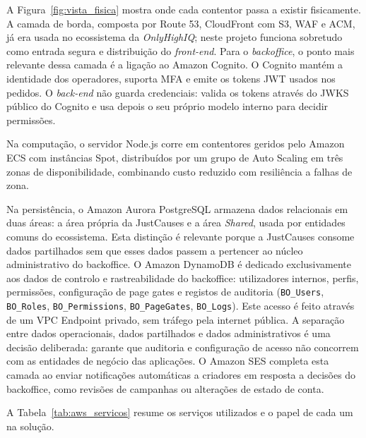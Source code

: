 A Figura~\ref{fig:vista_fisica} mostra onde cada contentor passa a existir fisicamente. A camada de borda, composta por Route 53, CloudFront com S3, \gls{WAF} e ACM, já era usada no ecossistema da \textit{OnlyHighIQ}; neste projeto funciona sobretudo como entrada segura e distribuição do \textit{front-end}. Para o \textit{backoffice}, o ponto mais relevante dessa camada é a ligação ao Amazon Cognito. O Cognito mantém a identidade dos operadores, suporta \gls{MFA} e emite os tokens JWT usados nos pedidos. O \textit{back-end} não guarda credenciais: valida os tokens através do \gls{JWKS} público do Cognito e usa depois o seu próprio modelo interno para decidir permissões.

Na computação, o servidor Node.js corre em contentores geridos pelo Amazon ECS com instâncias Spot, distribuídos por um grupo de Auto Scaling em três zonas de disponibilidade, combinando custo reduzido com resiliência a falhas de zona.

Na persistência, o Amazon Aurora PostgreSQL armazena dados relacionais em duas áreas: a área própria da JustCauses e a área \textit{Shared}, usada por entidades comuns do ecossistema. Esta distinção é relevante porque a JustCauses consome dados partilhados sem que esses dados passem a pertencer ao núcleo administrativo do backoffice. O Amazon DynamoDB é dedicado exclusivamente aos dados de controlo e rastreabilidade do backoffice: utilizadores internos, perfis, permissões, configuração de page gates e registos de auditoria (\texttt{BO\_Users}, \texttt{BO\_Roles}, \texttt{BO\_Permissions}, \texttt{BO\_PageGates}, \texttt{BO\_Logs}). Este acesso é feito através de um VPC Endpoint privado, sem tráfego pela internet pública. A separação entre dados operacionais, dados partilhados e dados administrativos é uma decisão deliberada: garante que auditoria e configuração de acesso não concorrem com as entidades de negócio das aplicações. O Amazon SES completa esta camada ao enviar notificações automáticas a criadores em resposta a decisões do backoffice, como revisões de campanhas ou alterações de estado de conta.

A Tabela~\ref{tab:aws_servicos} resume os serviços utilizados e o papel de cada um na solução.

